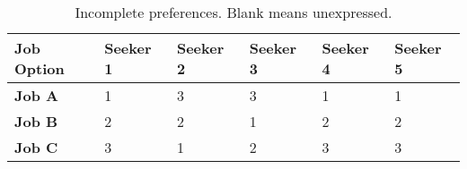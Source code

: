 \begin{table}[h!]
\begin{center}
\caption{Incomplete preferences. Blank means unexpressed.}
\label{toy_icomplete}
\begin{tabular}{l|l|l|l|l|l}
\hline 
\textbf{Job Option} & \textbf{Seeker 1} &  \textbf{Seeker 2} & \textbf{Seeker 3} &\textbf{Seeker 4} &\textbf{Seeker 5} \\
\hline
\textbf{Job A} & 1 & 3 & 3 & 1 & 1\\
\textbf{Job B} & 2 & 2 & 1 & 2 & 2\\
\textbf{Job C} & 3 & 1 & 2 & 3 & 3\\
\hline 
\end{tabular}
\end{center}
\end{table}
